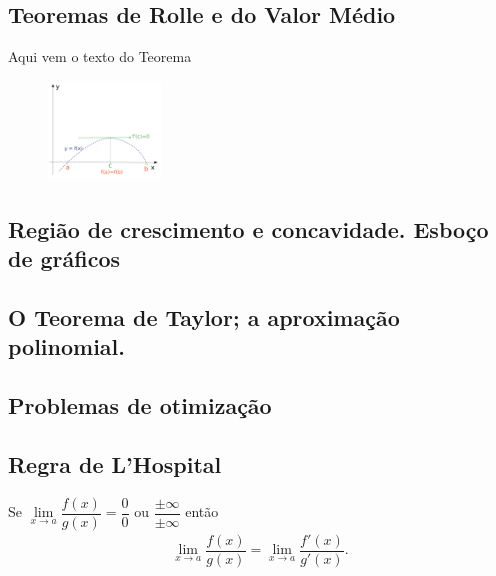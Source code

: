 \subsection*{Teoremas de Rolle e do Valor Médio}
\begin{tcolorbox}
\begin{teorema} Aqui vem o texto do Teorema

\begin{figure}[H]
    \centering
    \includegraphics[scale=0.25, height=100px]{Figuras/rolle.png}
\end{figure}
\end{teorema}
\begin{teorema}

\end{teorema}
\end{tcolorbox}
\subsection*{Região de crescimento e concavidade. Esboço de gráficos}

\subsection*{ O Teorema de Taylor; a aproximação polinomial. }
\subsection*{Problemas de otimização}
\subsection*{Regra de L'Hospital}
\begin{tcolorbox}
Se $\lim\limits_{x\to a}\dfrac{f(x)}{g(x)}=\dfrac{0}{0} \text{ ou } \dfrac{\pm\infty}{\pm\infty}$ então
\begin{align*}
    \lim\limits_{x\to a}\dfrac{f(x)}{g(x)}=\lim\limits_{x\to a}\dfrac{f'(x)}{g'(x)}.
\end{align*}
\end{tcolorbox}